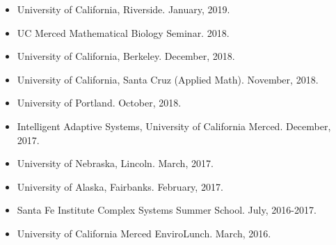 \documentclass[margin,line,12pt]{res}
\begin{document}
\begin{resume}
\begin{itemize}
\item University of California, Riverside. January, 2019.

\item UC Merced Mathematical Biology Seminar. 2018.

\item University of California, Berkeley. December, 2018.

\item University of California, Santa Cruz (Applied Math). November, 2018.

\item University of Portland. October, 2018.

\item Intelligent Adaptive Systems, University of California Merced. December, 2017.

\item University of Nebraska, Lincoln. March, 2017.

\item University of Alaska, Fairbanks. February, 2017.

\item Santa Fe Institute Complex Systems Summer School. July, 2016-2017.

\item University of California Merced EnviroLunch. March, 2016.


\end{itemize}
\end{resume}
\end{document}
